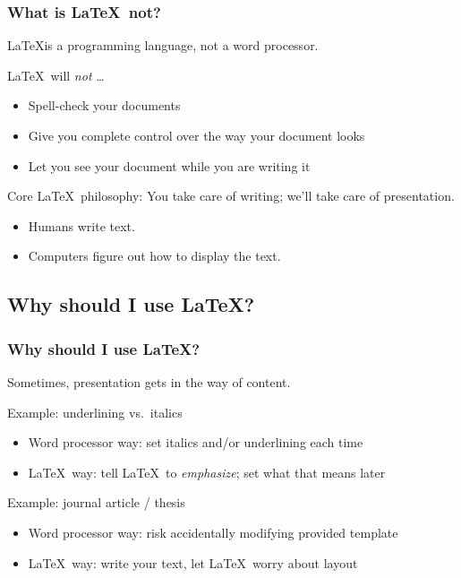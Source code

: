 \documentclass[ignorenonframetext]{beamer}
\begin{document}
\begin{frame}
  \frametitle{What is \LaTeX\ not?}
  \LaTeX is a programming language, not a word processor.
  \begin{block}{\LaTeX\ will \emph{not} \ldots}
    \begin{itemize}
    \item Spell-check your documents
    \item Give you complete control over the way your document looks
    \item Let you see your document while you are writing it
    \end{itemize}
  \end{block}
  \begin{block}{Core \LaTeX\ philosophy:}
    You take care of writing; we'll take care of presentation.
    \begin{itemize}
    \item Humans write text.
    \item Computers figure out how to display the text.
    \end{itemize}
  \end{block}
\end{frame}

\subsection{Why should I use \LaTeX?}
\begin{frame}
  \frametitle{Why should I use \LaTeX?}
  Sometimes, presentation gets in the way of content.
  \begin{block}{Example: underlining vs.\ italics}
    \begin{itemize}
    \item Word processor way: set italics and/or underlining each time
    \item \LaTeX\ way: tell \LaTeX\ to \emph{emphasize}; set what that means later
    \end{itemize}
  \end{block}
  \begin{block}{Example: journal article / thesis}
    \begin{itemize}
    \item Word processor way: risk accidentally modifying provided template
    \item \LaTeX\ way: write your text, let \LaTeX\ worry about layout
    \end{itemize}
  \end{block}
\end{frame}
\end{document}
